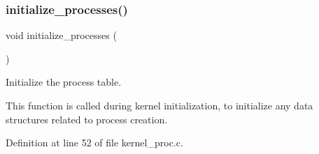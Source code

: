 \subsubsection{\texorpdfstring{initialize\+\_\+processes()}{initialize\_processes()}}
{\footnotesize\ttfamily void initialize\+\_\+processes (\begin{DoxyParamCaption}{ }\end{DoxyParamCaption})}



Initialize the process table. 

This function is called during kernel initialization, to initialize any data structures related to process creation. 

Definition at line 52 of file kernel\+\_\+proc.\+c.


